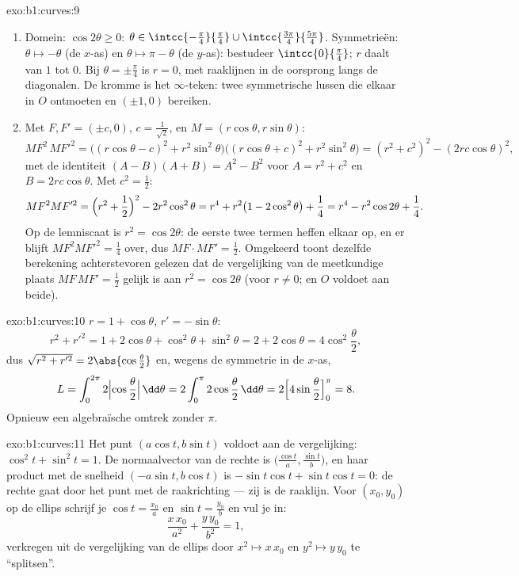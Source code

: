 \begin{solution}{exo:b1:curves:9}
\begin{enumerate}
  \item Domein: $\cos 2\theta \geq 0$: $\theta \in
        \intcc{-\frac\pi4}{\frac\pi4} \cup
        \intcc{\frac{3\pi}{4}}{\frac{5\pi}{4}}$. Symmetrieën:
        $\theta \mapsto -\theta$ (de $x$-as) en $\theta \mapsto \pi
        - \theta$ (de $y$-as): bestudeer
        $\intcc{0}{\frac\pi4}$; $r$ daalt van $1$ tot $0$. Bij
        $\theta = \pm\frac\pi4$ is $r = 0$, met raaklijnen in de
        oorsprong langs de diagonalen. De kromme is het
        $\infty$-teken: twee symmetrische lussen die elkaar in $O$
        ontmoeten en $(\pm 1, 0)$ bereiken.
  \item Met $F, F' = (\pm c, 0)$, $c = \frac{1}{\sqrt 2}$, en $M =
        (r\cos\theta, r\sin\theta)$:
        \[
        MF^2\, MF'^2
        = \bigl((r\cos\theta - c)^2 + r^2\sin^2\theta\bigr)
        \bigl((r\cos\theta + c)^2 + r^2\sin^2\theta\bigr)
        = (r^2 + c^2)^2 - (2rc\cos\theta)^2 ,
        \]
        met de identiteit $(A - B)(A + B) = A^2 - B^2$ voor $A =
        r^2 + c^2$ en $B = 2rc\cos\theta$. Met $c^2 = \frac12$:
        \[
        MF^2 MF'^2 = \Bigl(r^2 + \frac12\Bigr)^2 - 2r^2\cos^2\theta
        = r^4 + r^2\bigl(1 - 2\cos^2\theta\bigr) + \frac14
        = r^4 - r^2\cos 2\theta + \frac14 .
        \]
        Op de lemniscaat is $r^2 = \cos 2\theta$: de eerste twee
        termen heffen elkaar op, en er blijft $MF^2MF'^2 = \frac14$
        over, dus $MF \cdot MF' = \frac12$. Omgekeerd toont dezelfde
        berekening achterstevoren gelezen dat de vergelijking van de
        meetkundige plaats $MF\,MF' = \frac12$ gelijk is aan $r^2 =
        \cos 2\theta$ (voor $r \neq 0$; en $O$ voldoet aan beide).
\end{enumerate}
\end{solution}

\begin{solution}{exo:b1:curves:10}
$r = 1 + \cos\theta$, $r' = -\sin\theta$:
\[
r^2 + r'^2 = 1 + 2\cos\theta + \cos^2\theta + \sin^2\theta
= 2 + 2\cos\theta = 4\cos^2\frac\theta2 ,
\]
dus $\sqrt{r^2 + r'^2} = 2\abs{\cos\frac\theta2}$ en, wegens de
symmetrie in de $x$-as,
\[
L = \int_0^{2\pi} 2\Bigl|\cos\frac\theta2\Bigr|\,\dd\theta
= 2\int_0^{\pi} 2\cos\frac\theta2\,\dd\theta
= 2\Bigl[4\sin\frac\theta2\Bigr]_0^{\pi} = 8 .
\]
Opnieuw een algebraïsche omtrek zonder $\pi$.
\end{solution}

\begin{solution}{exo:b1:curves:11}
Het punt $(a\cos t, b\sin t)$ voldoet aan de vergelijking: $\cos^2 t
+ \sin^2 t = 1$. De normaalvector van de rechte is
$\bigl(\frac{\cos t}a, \frac{\sin t}b\bigr)$, en haar product met
de snelheid $(-a\sin t, b\cos t)$ is $-\sin t\cos t + \sin t\cos t =
0$: de rechte gaat door het punt met de raakrichting --- zij is de
raaklijn. Voor $(x_0, y_0)$ op de ellips schrijf je $\cos t =
\frac{x_0}a$ en $\sin t = \frac{y_0}b$ en vul je in:
\[
\frac{x\,x_0}{a^2} + \frac{y\,y_0}{b^2} = 1 ,
\]
verkregen uit de vergelijking van de ellips door $x^2 \mapsto
x\,x_0$ en $y^2 \mapsto y\,y_0$ te ``splitsen''.
\end{solution}

